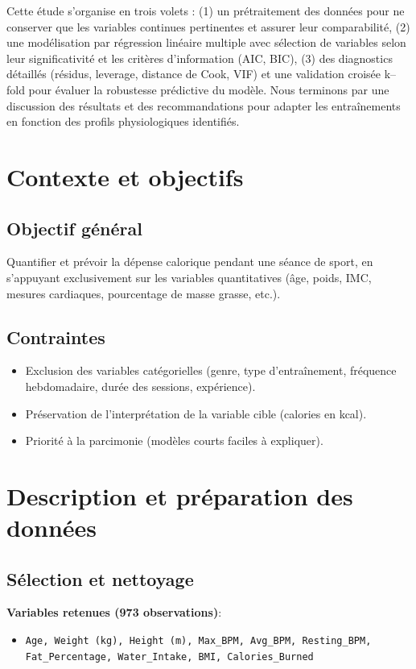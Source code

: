 \documentclass[12pt,a4paper]{article}
\begin{document}
Cette étude s’organise en trois volets : (1) un prétraitement des données pour ne conserver que les variables continues pertinentes et assurer leur comparabilité, (2) une modélisation par régression linéaire multiple avec sélection de variables selon leur significativité et les critères d’information (AIC, BIC), (3) des diagnostics détaillés (résidus, leverage, distance de Cook, VIF) et une validation croisée k–fold pour évaluer la robustesse prédictive du modèle. Nous terminons par une discussion des résultats et des recommandations pour adapter les entraînements en fonction des profils physiologiques identifiés.


\section{Contexte et objectifs}

\subsection{Objectif général}
Quantifier et prévoir la dépense calorique pendant une séance de sport, en s’appuyant exclusivement sur les variables quantitatives (âge, poids, IMC, mesures cardiaques, pourcentage de masse grasse, etc.).

\subsection{Contraintes}
\begin{itemize}
    \item Exclusion des variables catégorielles (genre, type d’entraînement, fréquence hebdomadaire, durée des sessions, expérience).
    \item Préservation de l’interprétation de la variable cible (calories en kcal).
    \item Priorité à la parcimonie (modèles courts faciles à expliquer).
\end{itemize}


\section{Description et préparation des données}

\subsection{Sélection et nettoyage}
\textbf{Variables retenues (973 observations)}:
\begin{itemize}
    \item \texttt{Age, Weight (kg), Height (m), Max\_BPM, Avg\_BPM, Resting\_BPM,\\ Fat\_Percentage, Water\_Intake, BMI, Calories\_Burned}
\end{itemize}
\end{document}
